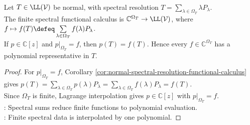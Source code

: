 \begin{theorem} \label{thm:finite-spectral-functional-calculus-normal} \\
Let $T\in\LL(\mathcal{V})$ be normal, with spectral resolution $T=\sum\limits_{\lambda\in\Omega_T}\lambda P_{\lambda}$.\\
The finite spectral functional calculus is $\mathbb{C}^{\Omega_T}\to\LL(\mathcal{V})$, where $f\mapsto f(T)\defeq\sum\limits_{\lambda\in\Omega_T}f(\lambda)P_{\lambda}$.\\
If $p\in\mathbb{C}[z]$ and $p|_{\Omega_T}=f$, then $p(T)=f(T)$. Hence every $f\in\mathbb{C}^{\Omega_T}$ has a polynomial representative in $T$.
\begin{proof}
For $p|_{\Omega_T}=f$, Corollary \ref{cor:normal-spectral-resolution-functional-calculus} gives $p(T)=\sum\limits_{\lambda\in\Omega_T}p(\lambda)P_{\lambda} =\sum\limits_{\lambda\in\Omega_T}f(\lambda)P_{\lambda} =f(T)$.\\
Since $\Omega_T$ is finite, Lagrange interpolation gives $p\in\mathbb{C}[z]$ with $p|_{\Omega_T}=f$.\\
: Spectral sums reduce finite functions to polynomial evaluation.\\
: Finite spectral data is interpolated by one polynomial.
\end{proof}
\end{theorem}

